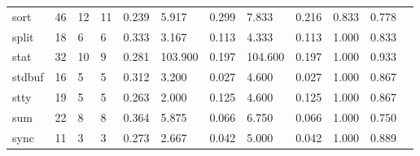 \begin{longtable}{lp{1.00cm}p{1.00cm}p{1.00cm}p{1.00cm}p{1.00cm}p{1.00cm}p{1.00cm}p{1.00cm}p{1.00cm}p{1.00cm}p{1.00cm}}
sort      &                           46 &                 12 &                                11 &                                      0.239 &                                  5.917 &                                        0.299 &                             7.833 &                                   0.216 &                        0.833 &                                        0.778 \\
split     &                           18 &                  6 &                                 6 &                                      0.333 &                                  3.167 &                                        0.113 &                             4.333 &                                   0.113 &                        1.000 &                                        0.833 \\
stat      &                           32 &                 10 &                                 9 &                                      0.281 &                                103.900 &                                        0.197 &                           104.600 &                                   0.197 &                        1.000 &                                        0.933 \\
stdbuf    &                           16 &                  5 &                                 5 &                                      0.312 &                                  3.200 &                                        0.027 &                             4.600 &                                   0.027 &                        1.000 &                                        0.867 \\
stty      &                           19 &                  5 &                                 5 &                                      0.263 &                                  2.000 &                                        0.125 &                             4.600 &                                   0.125 &                        1.000 &                                        0.867 \\
sum       &                           22 &                  8 &                                 8 &                                      0.364 &                                  5.875 &                                        0.066 &                             6.750 &                                   0.066 &                        1.000 &                                        0.750 \\
sync      &                           11 &                  3 &                                 3 &                                      0.273 &                                  2.667 &                                        0.042 &                             5.000 &                                   0.042 &                        1.000 &                                        0.889 \\

\end{longtable}
